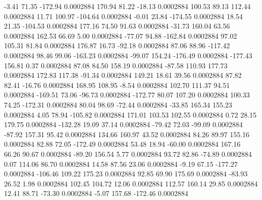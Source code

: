        -3.41       71.35     -172.94     0.0002884
      170.94       81.22      -18.13     0.0002884
      100.53       89.13      112.44     0.0002884
       11.71      100.97     -104.64     0.0002884
       -0.01       23.84     -174.55     0.0002884
       18.54       21.35     -104.53     0.0002884
      177.16       74.50       91.63     0.0002884
      -31.73      160.04       63.56     0.0002884
      162.53       66.69        5.00     0.0002884
      -77.07       94.88     -162.84     0.0002884
       97.02      105.31       81.84     0.0002884
      176.87       16.73      -92.18     0.0002884
       87.06       88.96     -117.42     0.0002884
       98.46       99.06     -163.23     0.0002884
      -99.07      154.24     -176.49     0.0002884
     -177.43      156.81        0.37     0.0002884
       87.08       84.50      158.19     0.0002884
      -87.58      110.93      177.73     0.0002884
      172.83      117.38      -91.34     0.0002884
      149.21       18.61       39.56     0.0002884
       87.82       82.41      -16.76     0.0002884
      168.95      108.95       -8.54     0.0002884
      102.70      111.37       94.51     0.0002884
     -169.51       73.06      -96.73     0.0002884
     -172.77       80.07      107.20     0.0002884
      100.33       74.25     -172.31     0.0002884
       80.04       98.69      -72.44     0.0002884
      -33.85      165.34      155.23     0.0002884
        4.05       78.94     -105.82     0.0002884
      171.01      103.53      102.55     0.0002884
        0.72       28.15      179.75     0.0002884
     -132.28       19.09       37.14     0.0002884
      -79.42       72.03      -99.09     0.0002884
      -87.92      157.31       95.42     0.0002884
      134.66      160.97       43.52     0.0002884
       84.26       89.97      155.16     0.0002884
       82.88       72.05     -172.49     0.0002884
       53.48       18.94      -60.00     0.0002884
      167.16       66.26       90.67     0.0002884
      -89.20      156.54        5.77     0.0002884
       93.72       82.86      -74.89     0.0002884
        0.07      114.06       86.70     0.0002884
       14.58       87.56       23.06     0.0002884
       -9.19       67.15     -177.27     0.0002884
     -106.46      109.22      175.23     0.0002884
       92.85       69.90      175.69     0.0002884
      -83.93       26.52        1.98     0.0002884
      102.45      104.72       12.06     0.0002884
      112.57      160.14       29.85     0.0002884
       12.41       88.71      -73.30     0.0002884
       -5.07      157.68     -172.46     0.0002884
